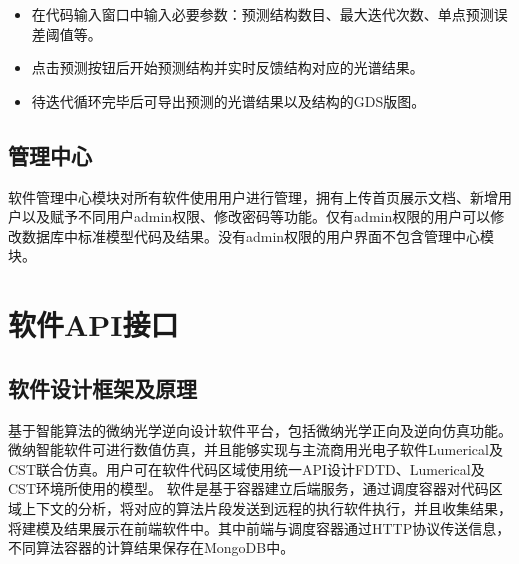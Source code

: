 \documentclass[a4paper,10pt,english]{sphinxmanual}
\begin{document}
{{{{\sphinxAtStartPar
{}
\begin{itemize}
\item {} 
\sphinxAtStartPar
在代码输入窗口中输入必要参数：预测结构数目、最大迭代次数、单点预测误差阈值等。

\item {} 
\sphinxAtStartPar
点击预测按钮后开始预测结构并实时反馈结构对应的光谱结果。

\item {} 
\sphinxAtStartPar
待迭代循环完毕后可导出预测的光谱结果以及结构的GDS版图。


\end{itemize}

\sphinxAtStartPar
{}





\sphinxstepscope


\section{管理中心}
\label{\detokenize{_u8f6f_u4ef6_u6a21_u5757_u4ecb_u7ecd/_u7ba1_u7406_u4e2d_u5fc3/contents:id1}}\label{\detokenize{_u8f6f_u4ef6_u6a21_u5757_u4ecb_u7ecd/_u7ba1_u7406_u4e2d_u5fc3/contents::doc}}
\sphinxAtStartPar
软件管理中心模块对所有软件使用用户进行管理，拥有上传首页展示文档、新增用户以及赋予不同用户admin权限、修改密码等功能。仅有admin权限的用户可以修改数据库中标准模型代码及结果。没有admin权限的用户界面不包含管理中心模块。


\sphinxAtStartPar
{}





\sphinxstepscope


\chapter{软件API接口}
\label{\detokenize{_u8f6f_u4ef6API_u63a5_u53e3/contents:api}}\label{\detokenize{_u8f6f_u4ef6API_u63a5_u53e3/contents::doc}}
\sphinxstepscope


\section{软件设计框架及原理}
\label{\detokenize{_u8f6f_u4ef6API_u63a5_u53e3/_u8f6f_u4ef6_u8bbe_u8ba1_u6846_u67b6_u53ca_u539f_u7406/_u8f6f_u4ef6_u8bbe_u8ba1_u6846_u67b6_u53ca_u539f_u7406:id1}}\label{\detokenize{_u8f6f_u4ef6API_u63a5_u53e3/_u8f6f_u4ef6_u8bbe_u8ba1_u6846_u67b6_u53ca_u539f_u7406/_u8f6f_u4ef6_u8bbe_u8ba1_u6846_u67b6_u53ca_u539f_u7406::doc}}
\sphinxAtStartPar
基于智能算法的微纳光学逆向设计软件平台，包括微纳光学正向及逆向仿真功能。微纳智能软件可进行数值仿真，并且能够实现与主流商用光电子软件\sphinxhyphen{}Lumerical及CST联合仿真。用户可在软件代码区域使用统一API设计FDTD、Lumerical及CST环境所使用的模型。
软件是基于容器建立后端服务，通过调度容器对代码区域上下文的分析，将对应的算法片段发送到远程的执行软件执行，并且收集结果，将建模及结果展示在前端软件中。其中前端与调度容器通过HTTP协议传送信息，不同算法容器的计算结果保存在MongoDB中。


}}}}
\end{document}
